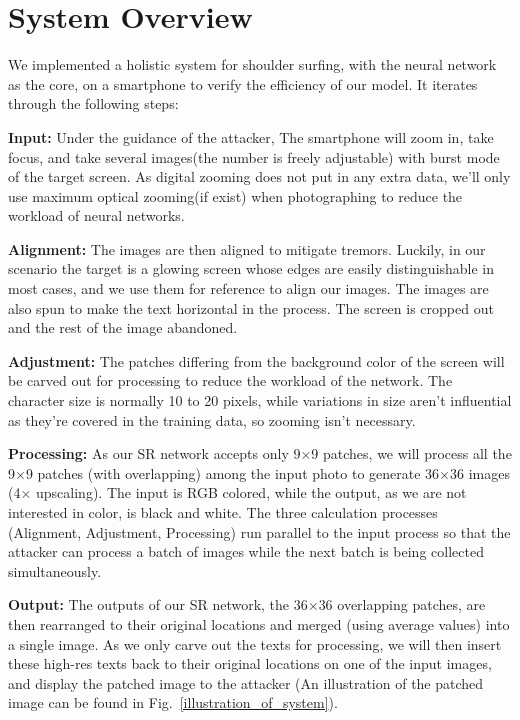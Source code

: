 \section{System Overview}
\label{sec-system-overview} 
We implemented a holistic system for shoulder surfing, with the neural network as the core, on a smartphone to verify the efficiency of our model. It iterates through the following steps: 

\vspace{1mm}
\noindent
\textbf{Input:} Under the guidance of the attacker, The smartphone will zoom in, take focus, and take several images(the number is freely adjustable) with burst mode of the target screen. As digital zooming does not put in any extra data, we'll only use maximum optical zooming(if exist) when photographing to reduce the workload of neural networks.

\vspace{1mm}
\noindent
\textbf{Alignment:} The images are then aligned to mitigate tremors. Luckily, in our scenario the target is a glowing screen whose edges are easily distinguishable in most cases, and we use them for reference to align our images. The images are also spun to make the text horizontal in the process. The screen is cropped out and the rest of the image abandoned.


\vspace{1mm}
\noindent
\textbf{Adjustment:} The patches differing from the background color of the screen will be carved out for processing to reduce the workload of the network. The character size is normally 10 to 20 pixels, while variations in size aren't influential as they're covered in the training data, so zooming isn't necessary.

\vspace{1mm}
\noindent
\textbf{Processing:} As our SR network accepts only 9$\times$9 patches, we will process all the 9$\times$9 patches (with overlapping) among the input photo to generate 36$\times$36 images (4$\times$ upscaling). The input is RGB colored, while the output, as we are not interested in color, is black and white. The three calculation processes (Alignment, Adjustment, Processing) run parallel to the input process so that the attacker can process a batch of images while the next batch is being collected simultaneously.
		
\vspace{1mm}
\noindent
\textbf{Output:} The outputs of our SR network, the 36$\times$36 overlapping patches, are then rearranged to their original locations and merged (using average values) into a single image. As we only carve out the texts for processing, we will then insert these high-res texts back to their original locations on one of the input images, and display the patched image to the attacker (An illustration of the patched image can be found in Fig.~\ref{illustration_of_system}).

